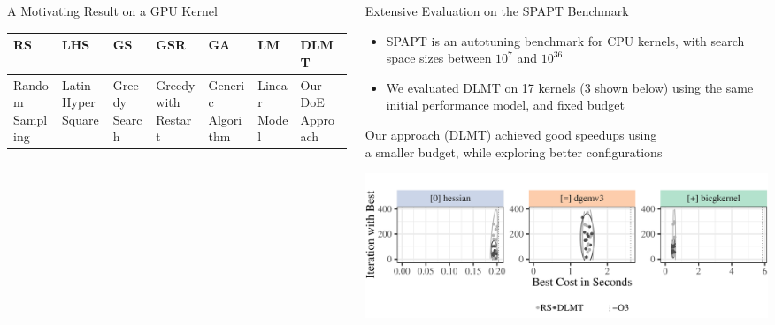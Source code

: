 \documentclass[11pt, compress, aspectratio=169, xcolor={table,usenames,dvipsnames}]{beamer}
\begin{document}
\begin{frame}
\begin{columns}
\begin{column}{0.89\columnwidth}
\begin{columns}
\begin{column}[t]{0.48\columnwidth}
\begin{block}{A Motivating Result on a GPU Kernel}
\begin{table}[htbp]
\centering
\tiny
\begin{tabular}{p{}p{}p{}p{}p{}p{}p{}}
\toprule
RS & LHS & GS & GSR & GA & LM & DLMT\\
\midrule
Random Sampling & Latin Hyper Square & Greedy Search & Greedy with Restart & Generic Algorithm & Linear Model & Our DoE Approach\\
\bottomrule
\end{tabular}
\end{table}
\end{block}
\end{column}
\begin{column}[t]{0.48\columnwidth}
\begin{block}{ \vphantom{g}Extensive Evaluation on the SPAPT Benchmark}
\begin{itemize}
\item \alert{SPAPT} is an \alert{autotuning benchmark} for \alert{CPU kernels}, with \alert{search space sizes}
between \alert{\(10^7\) and \(10^{36}\)}
\item We evaluated \alert{DLMT} on \alert{17 kernels} (\alert{3} shown below)
using \alert{the same initial performance model}, and \alert{fixed budget}
\end{itemize}

\vspace{0.3em}
\begin{center}
{\small
Our approach (\alert{DLMT}) achieved \alert{good speedups} using
      \\[0.3em] a \alert{smaller budget}, while \alert{exploring better
configurations}
}
\end{center}
\begin{center}
\begin{center}
\includegraphics[width=0.85\columnwidth]{../../../img/iteration_best_comparison.pdf}
\end{center}
\end{center}


\end{block}
\end{column}
\end{columns}
\end{column}
\end{columns}
\end{frame}
\end{document}
